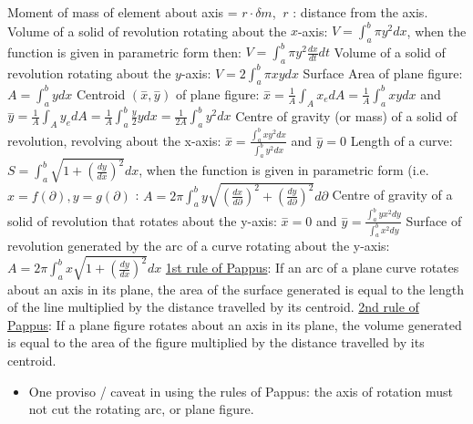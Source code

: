 \documentclass[12pt]{article}
\begin{document}
\begin{flushleft}
	\textbullet \quad Moment of mass of element about axis = $r \cdot \delta m $, $\ r$  :  distance from the axis.\linebreak 
	\textbullet \quad Volume of a solid of revolution rotating about the $x$-axis: $\displaystyle V= \int_a^b \pi y^2 dx$, when the function is given in parametric form then: $\displaystyle V=\int_a^b \pi y^2 \frac{dx}{dt} dt$ \linebreak 
	\textbullet \quad Volume of a solid of revolution rotating about the $y$-axis: $\displaystyle V = 2\int_a^b \pi xy dx$ \linebreak 
	\textbullet \quad Surface Area of plane figure: $A=\int_a^b ydx$ \linebreak 
	\textbullet \quad Centroid $\displaystyle \left( \overset{-}{x}, \overset{-}{y} \right)$ of plane figure: $\displaystyle \overset{-}{x} = \frac{1}{A} \int_A x_e dA = \frac{1}{A} \int_a^b xy dx$ and $ \overset{-}{y} = \frac{1}{A} \int_A y_e dA = \frac{1}{A} \int_a^b \frac{y}{2} ydx = \frac{1}{2A} \int_a^b y^2 dx$ \linebreak 
	\textbullet \quad Centre of gravity (or mass) of a solid of revolution, revolving about the x-axis: $\displaystyle \overset{-}{x} = \frac{\int_a^b xy^2 dx}{\int_a^b y^2 dx}$ and $\overset{-}{y} = 0$ \linebreak 
	\textbullet \quad Length of a curve: $\displaystyle S = \int_a^b \sqrt{1+\left( \frac{dy}{dx} \right)^2 } dx$, when the function is given in parametric form (i.e.$\displaystyle x=f(\partial), y=g(\partial)$  :  $\displaystyle A = 2\pi \int_a^b y \sqrt{\left(\frac{dx}{d\partial}\right)^2 + \left(\frac{dy}{d\partial}\right)^2} d\partial $ \linebreak 
	\textbullet \quad Centre of gravity of a solid of revolution that rotates about the y-axis: $\displaystyle \overset{-}{x} = 0$ and $\displaystyle \overset{-}{y} = \frac{\int_a^b yx^2 dy}{\int_a^b x^2 dy} $ \linebreak 
	\textbullet \quad Surface of revolution generated by the arc of a curve rotating about the y-axis: $\displaystyle A=2\pi \int_a^b x \sqrt{1 + \left( \frac{dy}{dx} \right)^2} dx $ \linebreak 
	\textbullet \quad \uline{1st rule of Pappus}: If an arc of a plane curve rotates about an axis in its plane, the area of the surface generated is equal to the length of the line multiplied by the distance travelled by its centroid. \linebreak 
	\textbullet \quad \uline{2nd rule of Pappus}: If a plane figure rotates about an axis in its plane, the volume generated is equal to the area of the figure multiplied by the distance travelled by its centroid.  
	\begin{itemize}
		\renewcommand{\labelitemi}{$\rightarrow$}
	\item One proviso / caveat in using the rules of Pappus: the axis of rotation must not cut the rotating arc, or plane figure. 
	\end{itemize}
	

\end{flushleft}
\end{document}
